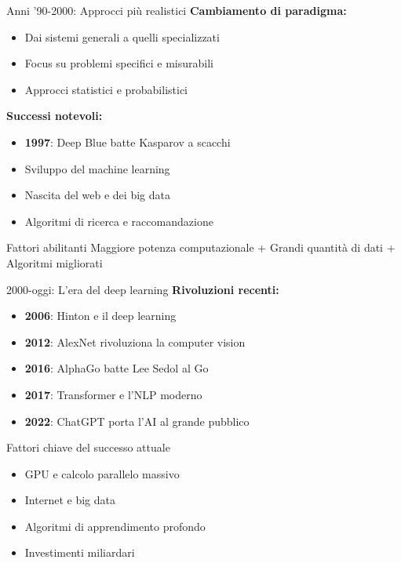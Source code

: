 \documentclass[aspectratio=169,12pt]{beamer}
\begin{document}
\begin{frame}{Anni '90-2000: Approcci più realistici}
    \textbf{Cambiamento di paradigma:}
    \begin{itemize}
        \item Dai sistemi generali a quelli specializzati
        \item Focus su problemi specifici e misurabili
        \item Approcci statistici e probabilistici
    \end{itemize}
    
    \vspace{0.3cm}
    
    \textbf{Successi notevoli:}
    \begin{itemize}
        \item \textbf{1997}: Deep Blue batte Kasparov a scacchi
        \item Sviluppo del machine learning
        \item Nascita del web e dei big data
        \item Algoritmi di ricerca e raccomandazione
    \end{itemize}
    
    \vspace{0.3cm}
    
    \begin{block}{Fattori abilitanti}
        Maggiore potenza computazionale + Grandi quantità di dati + Algoritmi migliorati
    \end{block}
\end{frame}
%
%
\begin{frame}{2000-oggi: L'era del deep learning}
    \textbf{Rivoluzioni recenti:}
    \begin{itemize}
        \item \textbf{2006}: Hinton e il deep learning
        \item \textbf{2012}: AlexNet rivoluziona la computer vision
        \item \textbf{2016}: AlphaGo batte Lee Sedol al Go
        \item \textbf{2017}: Transformer e l'NLP moderno
        \item \textbf{2022}: ChatGPT porta l'AI al grande pubblico
    \end{itemize}
    
    \vspace{0.3cm}
    
    \begin{alertblock}{Fattori chiave del successo attuale}
        \begin{itemize}
            \item GPU e calcolo parallelo massivo
            \item Internet e big data
            \item Algoritmi di apprendimento profondo
            \item Investimenti miliardari
        \end{itemize}
    \end{alertblock}
\end{frame}
%
\end{document}
